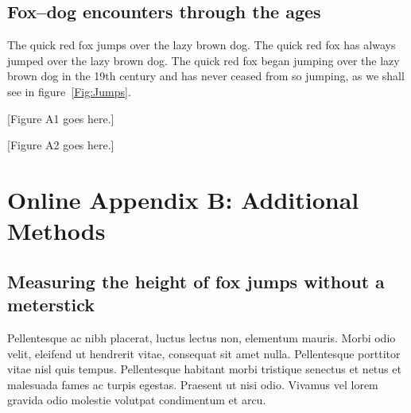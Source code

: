 \documentclass[11pt]{article}
\begin{document}

\renewcommand{\theequation}{A\arabic{equation}}
\renewcommand{\thetable}{A\arabic{table}}
\setcounter{equation}{0}  %
\setcounter{figure}{0}
\setcounter{table}{0}

\subsection*{Fox--dog encounters through the ages}

The quick red fox jumps over the lazy brown dog. The quick red fox has 
always jumped over the lazy brown dog. The quick red fox began jumping 
over the lazy brown dog in the 19th century and has never ceased from so 
jumping, as we shall see in figure~\ref{Fig:Jumps}.

[Figure A1 goes here.]

[Figure A2 goes here.]

\newpage{}

\section*{Online Appendix B: Additional Methods}

\renewcommand{\theequation}{B\arabic{equation}}
\setcounter{equation}{0}  %
\renewcommand{\thetable}{B\arabic{table}}
\setcounter{figure}{0}
\setcounter{table}{0}

\subsection*{Measuring the height of fox jumps without a meterstick}

Pellentesque ac nibh placerat, luctus lectus non, elementum mauris. 
Morbi odio velit, eleifend ut hendrerit vitae, consequat sit amet 
nulla. Pellentesque porttitor vitae nisl quis tempus. Pellentesque 
habitant morbi tristique senectus et netus et malesuada fames ac 
turpis egestas. Praesent ut nisi odio. Vivamus vel lorem gravida 
odio molestie volutpat condimentum et arcu. 
\end{document}
